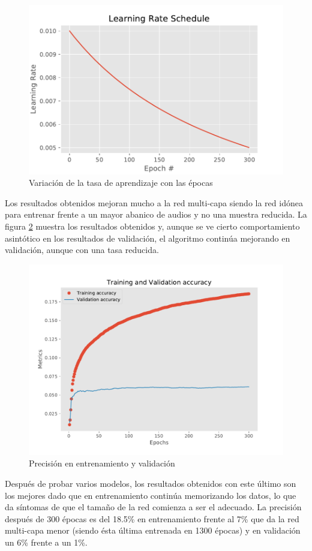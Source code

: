 \begin{figure}[h!]
	\centering
	\includegraphics[width=0.75\columnwidth]{figures/Learning_rate_schedule_comparison}
	\caption{Variación de la tasa de aprendizaje con las épocas}
	\label{fig: learning_rate_compa}
\end{figure}

Los resultados obtenidos mejoran mucho a la red multi-capa siendo la red idónea para entrenar frente a un mayor abanico de audios y no una muestra reducida. La figura \ref{fig: results_acc_compa} muestra los resultados obtenidos y, aunque se ve cierto comportamiento asintótico en los resultados de validación, el algoritmo continúa mejorando en validación, aunque con una tasa reducida.
\begin{figure}[t!]
	\centering
	\includegraphics[width=0.75\columnwidth]{figures/results_acc_compa.pdf}
	\vspace*{-10pt}
	\caption{Precisión en entrenamiento y validación}
	\label{fig: results_acc_compa}
\end{figure}

Después de probar varios modelos, los resultados obtenidos con este último son los mejores dado que en entrenamiento continúa memorizando los datos, lo que da síntomas de que el tamaño de la red comienza a ser el adecuado. La precisión después de 300 épocas es del 18.5\% en entrenamiento frente al 7\% que da la red multi-capa menor (siendo ésta última entrenada en 1300 épocas) y en validación un 6\% frente a un 1\%.

